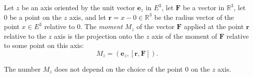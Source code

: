 Let $z$ be an axis oriented by the unit vector $\mathbf{e}_z$ in $E^3$, let $\mathbf{F}$ be a vector in $\mathbb{R}^3$, let $0$ be a point on the $z$ axis, and let $\mathbf{r} = x - 0 \in \mathbb{R}^3$ be the radius vector of the point $x \in E^3$ relative to $0$. The \textit{moment} $M_z$ of the vector $\mathbf{F}$ applied at the point $\mathbf{r}$ relative to the $z$ axis is the projection onto the $z$ axis of the moment of $\mathbf{F}$ relative to some point on this axis:
$$M_z = (\mathbf{e}_z, [\mathbf{r}, \mathbf{F}]).$$

The number $M_z$ does not depend on the choice of the point $0$ on the $z$ axis.
